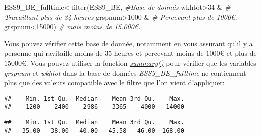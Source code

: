 \documentclass[
]{book}
\newenvironment{Shaded}{\begin{snugshade}}{\end{snugshade}}
\newcommand{\CommentTok}[1]{\textcolor[rgb]{0.56,0.35,0.01}{\textit{#1}}}
\newcommand{\DecValTok}[1]{\textcolor[rgb]{0.00,0.00,0.81}{#1}}
\newcommand{\FunctionTok}[1]{\textcolor[rgb]{0.00,0.00,0.00}{#1}}
\newcommand{\NormalTok}[1]{#1}
\newcommand{\OtherTok}[1]{\textcolor[rgb]{0.56,0.35,0.01}{#1}}
\newcommand{\SpecialCharTok}[1]{\textcolor[rgb]{0.00,0.00,0.00}{#1}}
\begin{document}
\begin{Shaded}
\begin{Highlighting}[]
\NormalTok{ESS9\_BE\_fulltime}\OtherTok{\textless{}{-}}\FunctionTok{filter}\NormalTok{(ESS9\_BE, }\CommentTok{\#Base de donnés}
\NormalTok{                   wkhtot}\SpecialCharTok{\textgreater{}}\DecValTok{34} \SpecialCharTok{\&} \CommentTok{\# Travaillant plus de 34 heures}
\NormalTok{                     grspnum}\SpecialCharTok{\textgreater{}}\DecValTok{1000} \SpecialCharTok{\&} \CommentTok{\# Percevant plus de 1000€,}
\NormalTok{                     grspnum}\SpecialCharTok{\textless{}}\DecValTok{15000}\NormalTok{) }\CommentTok{\# mais moins de 15.000€.}
\end{Highlighting}
\end{Shaded}

Vous pouvez vérifier cette base de donnée, notamment en vous assurant qu'il y a personne qui ravitaille moins de 35 heures et percevant moins de \(1000€\) et plus de \(15000€\). Vous pouvez utiliser la fonction \href{https://www.rdocumentation.org/packages/base/versions/3.6.2/topics/summary}{\emph{summary()}} pour vérifier que les variables \emph{grspnum} et \emph{wkhtot} dans la base de données \emph{ESS9\_BE\_fulltime} ne contiennent plus que des valeurs compatible avec le filtre que l'on vient d'appliquer:

\begin{Shaded}
\end{Shaded}

\begin{verbatim}
##    Min. 1st Qu.  Median    Mean 3rd Qu.    Max. 
##    1200    2400    2986    3365    4000   14000
\end{verbatim}

\begin{Shaded}
\end{Shaded}

\begin{verbatim}
##    Min. 1st Qu.  Median    Mean 3rd Qu.    Max. 
##   35.00   38.00   40.00   45.58   46.00  168.00
\end{verbatim}
\end{document}
